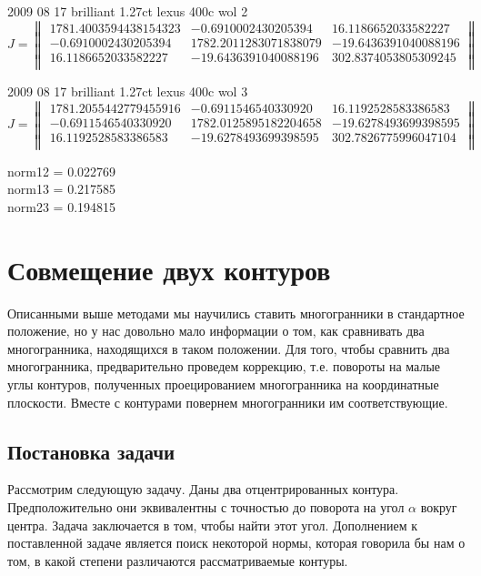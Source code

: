 \documentclass[a4paper,12pt, titlepage]{article}
\begin{document}
2009 08 17 brilliant 1.27ct lexus 400c wol 2
\[
J = 
\begin{Vmatrix}
	1781.4003594438154323 &	-0.6910002430205394 &	16.1186652033582227	\\
	-0.6910002430205394	 & 1782.2011283071838079	& -19.6436391040088196\\
	16.1186652033582227	& -19.6436391040088196	& 302.8374053805309245	\\
\end{Vmatrix}
\]

2009 08 17 brilliant 1.27ct lexus 400c wol 3
\[
J = 
\begin{Vmatrix}
1781.2055442779455916 &	-0.6911546540330920 &	16.1192528583386583	\\
-0.6911546540330920 &	1782.0125895182204658 &	-19.6278493699398595	\\
16.1192528583386583 &	-19.6278493699398595 &	302.7826775996047104	\\
\end{Vmatrix}
\]

norm12 =  0.022769\\

norm13 =  0.217585\\

norm23 =  0.194815\\



\newpage
\section{Совмещение двух контуров}
 Описанными выше методами мы научились ставить многогранники в стандартное положение, но у нас довольно мало 
информации о том, как сравнивать два многогранника, находящихся в таком положении. Для того, чтобы сравнить 
два многогранника, предварительно проведем коррекцию, т.е. повороты на малые углы контуров, полученных проецированием 
многогранника на координатные плоскости. Вместе с контурами повернем многогранники им соответствующие.

\subsection{Постановка задачи}
Рассмотрим следующую задачу. Даны два отцентрированных контура. Предположительно они эквивалентны с точностью до  поворота на 
угол $\alpha$ вокруг центра. Задача заключается в том, чтобы найти этот угол. Дополнением к 
поставленной задаче является  поиск некоторой нормы, которая говорила бы нам о том, в какой степени различаются рассматриваемые 
контуры.
\end{document}
